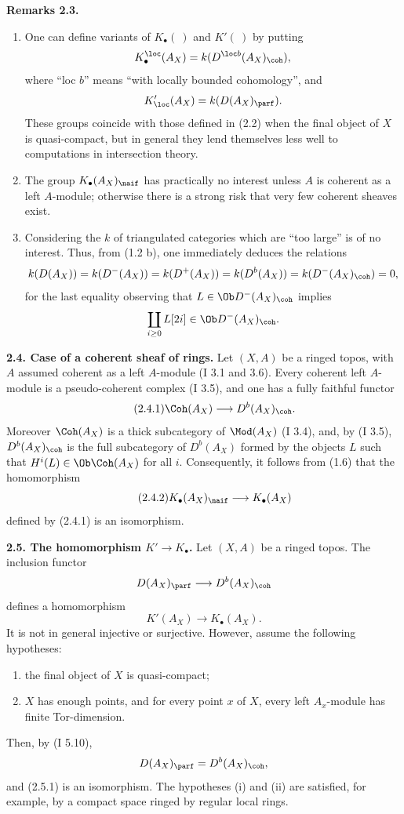 \documentclass[11pt]{article}
\begin{document}
\textbf{Remarks 2.3.}
\begin{enumerate}[label=\alph*)]
\item One can define variants of \(K_{\bullet}(\ )\) and \(K'(\ )\) by putting
\[
 K_{\bullet}^{\loc}(A_X)=k(D^{\loc b}(A_X)_{\coh}),
\]
where ``loc \(b\)'' means ``with locally bounded cohomology'', and
\[
 K_{\loc}'(A_X)=k(D(A_X)_{\parf}).
\]
These groups coincide with those defined in (2.2) when the final object of \(X\) is quasi-compact, but in general they lend themselves less well to computations in intersection theory.
\item The group \(K_{\bullet}(A_X)_{\naif}\) has practically no interest unless \(A\) is coherent as a left \(A\)-module; otherwise there is a strong risk that very few coherent sheaves exist.
\item Considering the \(k\) of triangulated categories which are ``too large'' is of no interest. Thus, from (1.2 b), one immediately deduces the relations
\[
 k(D(A_X))=
 k(D^-(A_X))=
 k(D^+(A_X))=
 k(D^b(A_X))=
 k(D^-(A_X)_{\coh})=0,
\]
for the last equality observing that \(L\in\Ob D^-(A_X)_{\coh}\) implies
\[
 \coprod_{i\geq0}L[2i]\in\Ob D^-(A_X)_{\coh}.
\]
\end{enumerate}

\textbf{2.4. Case of a coherent sheaf of rings.} Let \((X,A)\) be a ringed topos, with \(A\) assumed coherent as a left \(A\)-module (I 3.1 and 3.6). Every coherent left \(A\)-module is a pseudo-coherent complex (I 3.5), and one has a fully faithful functor
\begin{equation}\tag{2.4.1}
 \Coh(A_X)\longrightarrow D^b(A_X)_{\coh}.
\end{equation}
Moreover \(\Coh(A_X)\) is a thick subcategory of \(\Mod(A_X)\) (I 3.4), and, by (I 3.5), \(D^b(A_X)_{\coh}\) is the full subcategory of \(D^b(A_X)\) formed by the objects \(L\) such that \(H^i(L)\in\Ob\Coh(A_X)\) for all \(i\). Consequently, it follows from (1.6) that the homomorphism
\begin{equation}\tag{2.4.2}
 K_{\bullet}(A_X)_{\naif}\longrightarrow K_{\bullet}(A_X)
\end{equation}
defined by (2.4.1) is an isomorphism.

\textbf{2.5. The homomorphism \(K'\to K_{\bullet}\).} Let \((X,A)\) be a ringed topos. The inclusion functor
\[
 D(A_X)_{\parf}\longrightarrow D^b(A_X)_{\coh}
\]
defines a homomorphism
\begin{equation}\tag{2.5.1}
 K'(A_X)\longrightarrow K_{\bullet}(A_X).
\end{equation}
It is not in general injective or surjective. However, assume the following hypotheses:
\begin{enumerate}[label=(\roman*)]
\item the final object of \(X\) is quasi-compact;
\item \(X\) has enough points, and for every point \(x\) of \(X\), every left \(A_x\)-module has finite Tor-dimension.
\end{enumerate}
Then, by (I 5.10),
\[
 D(A_X)_{\parf}=D^b(A_X)_{\coh},
\]
and (2.5.1) is an isomorphism. The hypotheses (i) and (ii) are satisfied, for example, by a compact space ringed by regular local rings.
\end{document}
